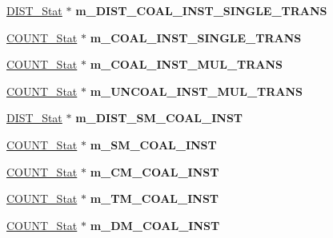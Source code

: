 \begin{DoxyCompactItemize}
\item 
\hypertarget{classall__stats__c_a3068e0b55c88b015327b62dfd7adef49}{
\hyperlink{classDIST__Stat}{DIST\_\-Stat} $\ast$ {\bfseries m\_\-DIST\_\-COAL\_\-INST\_\-SINGLE\_\-TRANS}}
\label{classall__stats__c_a3068e0b55c88b015327b62dfd7adef49}

\item 
\hypertarget{classall__stats__c_a550f3291a2229ffe610879708e18fd9a}{
\hyperlink{classCOUNT__Stat}{COUNT\_\-Stat} $\ast$ {\bfseries m\_\-COAL\_\-INST\_\-SINGLE\_\-TRANS}}
\label{classall__stats__c_a550f3291a2229ffe610879708e18fd9a}

\item 
\hypertarget{classall__stats__c_a2aba796d90ad84b38b3777b34b52e661}{
\hyperlink{classCOUNT__Stat}{COUNT\_\-Stat} $\ast$ {\bfseries m\_\-COAL\_\-INST\_\-MUL\_\-TRANS}}
\label{classall__stats__c_a2aba796d90ad84b38b3777b34b52e661}

\item 
\hypertarget{classall__stats__c_a4e43e5e61914978066c859666c2f02ef}{
\hyperlink{classCOUNT__Stat}{COUNT\_\-Stat} $\ast$ {\bfseries m\_\-UNCOAL\_\-INST\_\-MUL\_\-TRANS}}
\label{classall__stats__c_a4e43e5e61914978066c859666c2f02ef}

\item 
\hypertarget{classall__stats__c_a409c73eceaf30ac6d711dcecc81b8923}{
\hyperlink{classDIST__Stat}{DIST\_\-Stat} $\ast$ {\bfseries m\_\-DIST\_\-SM\_\-COAL\_\-INST}}
\label{classall__stats__c_a409c73eceaf30ac6d711dcecc81b8923}

\item 
\hypertarget{classall__stats__c_ab53bfccc0650b105a7a3c9e975a0d182}{
\hyperlink{classCOUNT__Stat}{COUNT\_\-Stat} $\ast$ {\bfseries m\_\-SM\_\-COAL\_\-INST}}
\label{classall__stats__c_ab53bfccc0650b105a7a3c9e975a0d182}

\item 
\hypertarget{classall__stats__c_ab87205d945e7f25f8fce8494bf7aee8a}{
\hyperlink{classCOUNT__Stat}{COUNT\_\-Stat} $\ast$ {\bfseries m\_\-CM\_\-COAL\_\-INST}}
\label{classall__stats__c_ab87205d945e7f25f8fce8494bf7aee8a}

\item 
\hypertarget{classall__stats__c_a84e1df8a92a162fa16860ea7780ece33}{
\hyperlink{classCOUNT__Stat}{COUNT\_\-Stat} $\ast$ {\bfseries m\_\-TM\_\-COAL\_\-INST}}
\label{classall__stats__c_a84e1df8a92a162fa16860ea7780ece33}

\item 
\hypertarget{classall__stats__c_a1203808db54f818ff180994077a0f201}{
\hyperlink{classCOUNT__Stat}{COUNT\_\-Stat} $\ast$ {\bfseries m\_\-DM\_\-COAL\_\-INST}}
\label{classall__stats__c_a1203808db54f818ff180994077a0f201}


\end{DoxyCompactItemize}
